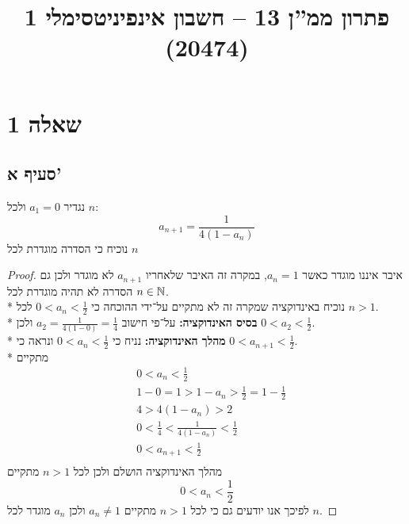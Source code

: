 
\title{פתרון ממ''ן 13 – חשבון אינפיניטסימלי 1 (20474)}


\maketitle
\section{שאלה 1}
\subsection{סעיף א'}
נגדיר $a_1 = 0$ ולכל $n$:
\[
	a_{n + 1} = \frac{1}{4(1 - a_n)}
\]
נוכיח כי הסדרה מוגדרת לכל $n$
\begin{proof}
	איבר איננו מוגדר כאשר $a_n = 1$, במקרה זה האיבר שלאחריו $a_{n + 1}$ לא מוגדר ולכן גם הסדרה לא תהיה מוגדרת לכל $n \in \mathbb{N}$. \\*
	נוכיח באינדוקציה שמקרה זה לא מתקיים על־ידי ההוכחה כי $0 < a_n < \frac{1}{2}$ לכל $n > 1$. \\*
	\textbf{בסיס האינדוקציה:} על־פי חישוב $a_2 = \frac{1}{4(1 - 0)} = \frac{1}{4}$ ולכן $0 < a_2 < \frac{1}{2}$. \\*
	\textbf{מהלך האינדוקציה:} נניח כי $0 < a_n < \frac{1}{2}$ ונראה כי $0 < a_{n + 1} < \frac{1}{2}$. \\*
	מתקיים
	\begin{align*}
		& 0 < a_n < \frac{1}{2} \\
		& 1 - 0 = 1 > 1 - a_n > \frac{1}{2} = 1 - \frac{1}{2} \\
		& 4 > 4(1 - a_n) > 2 \\
		& 0 < \frac{1}{4} < \frac{1}{4(1 - a_n)} < \frac{1}{2} \\
		& 0 < a_{n + 1} < \frac{1}{2} \\
	\end{align*}
	מהלך האינדוקציה הושלם ולכן לכל $n > 1$ מתקיים
	\[
		0 < a_n < \frac{1}{2}
	\]
	לפיכך אנו יודעים גם כי לכל $n > 1$ מתקיים $a_n \ne 1$ ולכן $a_n$ מוגדר לכל $n$.
\end{proof}

